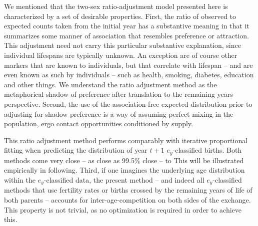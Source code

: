 
We mentioned that the two-sex ratio-adjustment model presented here is
characterized by a set of desirable properties. First, the ratio of observed 
to expected counts
taken from the initial year has a substantive meaning in that it summarizes
some manner of association that resembles preference or attraction. This
adjustment need not carry this particular substantive explanation, since
individual lifespans are typically unknown. An exception are of course other
 markers that are known to
individuals, but that correlate with lifespan -- and are even known as such by
individuals -- such as health, smoking, diabetes, education and other things. We
understand the ratio adjustment method as the metaphorical shadow of preference 
after translation to the remaining years perspective. Second, the use of the
association-free expected distribution prior to adjusting for shadow preference
is a way of assuming perfect mixing in the population, ergo contact
opportunities conditioned by supply.

This ratio adjustment method performs comparably with
iterative proportional fitting when predicting the distribution of 
year $t+1$ $e_y$-classified births. Both methods come very close -- as close
as 99.5\% close -- to This will be illustrated empirically in following. Third,
if one imagines the underlying age distribution within the $e_y$-classified data, the 
present method -- and indeed all $e_y$-classified methods that use fertility
rates or births crossed by the remaining years of life of both parents -- 
accounts for inter-age-competition on both sides of the exchange. This property
is not trivial, as no optimization is required in order to achieve this. 






